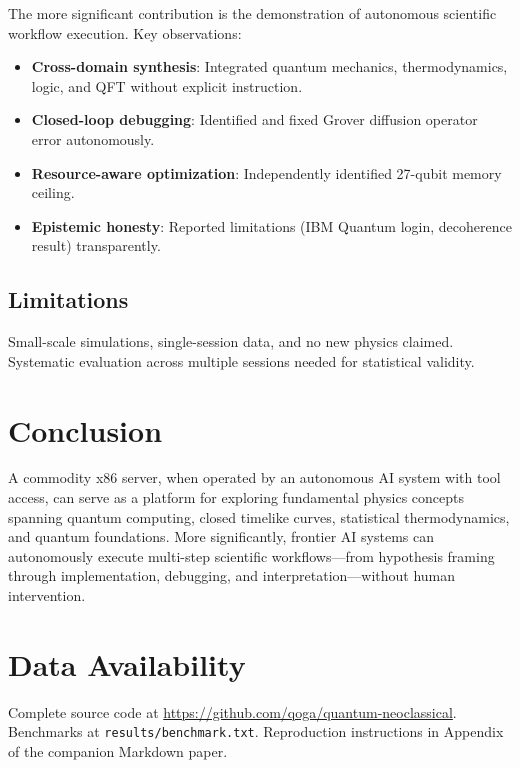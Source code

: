 \documentclass[12pt,a4paper]{article}
\begin{document}
The more significant contribution is the demonstration of autonomous scientific workflow execution. Key observations:

\begin{itemize}[noitemsep]
    \item \textbf{Cross-domain synthesis}: Integrated quantum mechanics, thermodynamics, logic, and QFT without explicit instruction.
    \item \textbf{Closed-loop debugging}: Identified and fixed Grover diffusion operator error autonomously.
    \item \textbf{Resource-aware optimization}: Independently identified 27-qubit memory ceiling.
    \item \textbf{Epistemic honesty}: Reported limitations (IBM Quantum login, decoherence result) transparently.
\end{itemize}

\subsection{Limitations}

Small-scale simulations, single-session data, and no new physics claimed. Systematic evaluation across multiple sessions needed for statistical validity.


\section{Conclusion}

A commodity x86 server, when operated by an autonomous AI system with tool access, can serve as a platform for exploring fundamental physics concepts spanning quantum computing, closed timelike curves, statistical thermodynamics, and quantum foundations. More significantly, frontier AI systems can autonomously execute multi-step scientific workflows—from hypothesis framing through implementation, debugging, and interpretation—without human intervention.

\section*{Data Availability}

Complete source code at \url{https://github.com/qoga/quantum-neoclassical}. Benchmarks at \texttt{results/benchmark.txt}. Reproduction instructions in Appendix of the companion Markdown paper.
\end{document}
